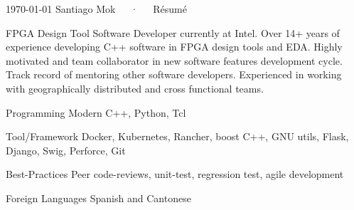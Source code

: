 \documentclass[12pt, letterpaper]{awesome-cv}
\begin{document}
\makecvheader[C]

\makecvfooter
  {\today}
  {Santiago Mok~~~·~~~Résumé}
  {\thepage}


\begin{cvparagraph}
FPGA Design Tool Software Developer currently at Intel. Over 14+ years of experience developing C++ software in FPGA design tools and EDA. Highly motivated and team collaborator in new software features development cycle. Track record of mentoring other software developers. Experienced in working with geographically distributed and cross functional teams.
\end{cvparagraph}


\begin{cvskills}
	\cvskill
		{Programming} %
		{Modern C++, Python, Tcl}

	\cvskill
		{Tool/Framework} 
		{Docker, Kubernetes, Rancher, boost C++, GNU utils, Flask, Django, Swig, Perforce, Git}

	\cvskill
		{Best-Practices} 
		{Peer code-reviews, unit-test, regression test, agile development}

	\cvskill
		{Foreign Languages} 
		{Spanish and Cantonese}

\end{cvskills}

\end{document}
